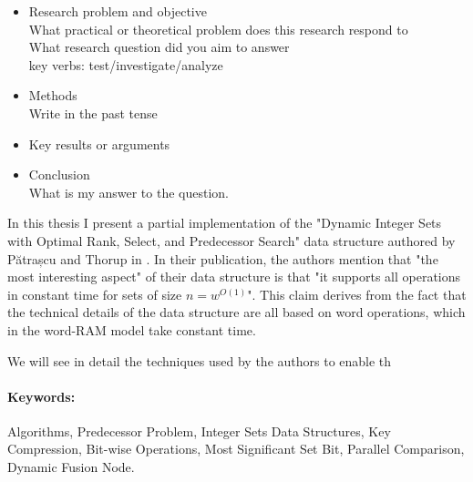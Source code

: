

\begin{itemize}
    \item
    Research problem and objective\\
    What practical or theoretical problem does this research respond to\\
    What research question did you aim to answer\\
    key verbs: test/investigate/analyze\\

    \item
    Methods\\
    Write in the past tense
    
    \item
    Key results or arguments
    
    \item
    Conclusion\\
    What is my answer to the question.
\end{itemize}

In this thesis I present a partial implementation of the "Dynamic Integer Sets with Optimal Rank, Select, and Predecessor Search" data structure authored by Pătrașcu and Thorup in \cite{patrascu2014dynamic}. In their publication, the authors mention that "the most interesting aspect" of their data structure is that "it supports all operations in constant time for sets of size $n = w^{O(1)}$". This claim derives from the fact that the technical details of the data structure are all based on word operations, which in the word-RAM model take constant time.

We will see in detail the techniques used by the authors to enable th

\paragraph*{Keywords:} Algorithms, Predecessor Problem, Integer Sets Data Structures, Key Compression, Bit-wise Operations, Most Significant Set Bit, Parallel Comparison, Dynamic Fusion Node.